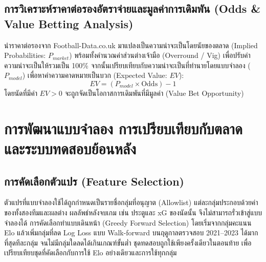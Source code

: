 \subsection{การวิเคราะห์ราคาต่อรองอัตราจ่ายและมูลค่าการเดิมพัน (Odds \& Value Betting Analysis)}
นำราคาต่อรองจาก Football-Data.co.uk มาแปลงเป็นความน่าจะเป็นโดยนัยของตลาด (Implied Probabilities: $P_{market}$) พร้อมทั้งคำนวณค่าส่วนต่างเจ้ามือ (Overround / Vig) เพื่อปรับค่าความน่าจะเป็นให้รวมเป็น 100\% จากนั้นเปรียบเทียบกับความน่าจะเป็นที่ทำนายโดยแบบจำลอง ($P_{model}$) เพื่อหาค่าความคาดหมายเป็นบวก (Expected Value: $EV$):
\begin{equation}
    EV = (P_{model} \times \text{Odds}) - 1
\end{equation}
โดยนัดที่มีค่า $EV > 0$ จะถูกจัดเป็นโอกาสการเดิมพันที่มีมูลค่า (Value Bet Opportunity)

\section{การพัฒนาแบบจำลอง การเปรียบเทียบกับตลาด และระบบทดสอบย้อนหลัง}

\subsection{การคัดเลือกตัวแปร (Feature Selection)}
ตัวแปรที่แบบจำลองใช้ได้ถูกกำหนดเป็นรายชื่อกลุ่มที่อนุญาต (Allowlist) แต่ละกลุ่มประกอบด้วยค่าของทั้งสองทีมและผลต่าง ผลลัพธ์หลังจบเกม เช่น ประตูและ xG ของนัดนั้น จึงไม่สามารถรั่วเข้าสู่แบบจำลองได้ การคัดเลือกทำแบบเดินหน้า (Greedy Forward Selection) โดยเริ่มจากกลุ่มคะแนน Elo แล้วเพิ่มกลุ่มที่ลด Log Loss แบบ Walk-forward บนฤดูกาลตรวจสอบ 2021--2023 ได้มากที่สุดทีละกลุ่ม จนไม่มีกลุ่มใดลดได้เกินเกณฑ์ขั้นต่ำ ชุดทดสอบถูกใช้เพียงครั้งเดียวในตอนท้าย เพื่อเปรียบเทียบชุดที่คัดเลือกกับการใช้ Elo อย่างเดียวและการใช้ทุกกลุ่ม

